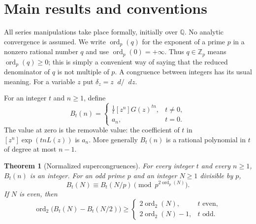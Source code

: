 \documentclass[11pt,letterpaper]{article}
\numberwithin{equation}{section}
\newtheorem{theorem}{Theorem}[section]
\theoremstyle{definition}
\theoremstyle{remark}
\newcommand{\Q}{\mathbb Q}
\newcommand{\Zp}{\mathbb Z_p}
\newcommand{\vp}{\operatorname{ord}_p}
\newcommand{\vtwo}{\operatorname{ord}_2}
\newcommand{\dd}{\mathop{}\!d}
\begin{document}
\section{Main results and conventions}\label{sec:main}
All series manipulations take place formally, initially over $\Q$.
No analytic convergence is assumed. We write $\vp(q)$ for the exponent
of a prime $p$ in a nonzero rational number $q$ and use
$\vp(0)=+\infty$. Thus $q\in\Zp$ means $\vp(q)\ge0$; this is simply a
convenient way of saying that the reduced denominator of $q$ is not
multiple of $p$. A congruence between integers has its usual meaning.
For a variable $z$ put $\delta_z=z\dd/\dd z$.

For an integer $t$ and $n\ge1$, define
\begin{equation}\label{eq:Bt}
 B_t(n)=
 \begin{cases}
 \displaystyle\frac1t[z^n]G(z)^{tn},&t\ne0,\\[5pt]
 a_n,&t=0.
 \end{cases}
\end{equation}
The value at zero is the removable value: the coefficient of $t$ in
$[z^n]\exp(tnL(z))$ is $a_n$. More generally $B_t(n)$ is a rational
polynomial in $t$ of degree at most $n-1$.

\begin{theorem}[Normalized supercongruences]\label{thm:normalized}
For every integer $t$ and every $n\ge1$, $B_t(n)$ is an integer.
For an odd prime $p$ and an integer $N\ge1$ divisible by $p$,
\begin{equation}\label{eq:B-odd}
 B_t(N)\equiv B_t(N/p)\pmod{p^{2\vp(N)}}.
\end{equation}
If $N$ is even, then
\begin{equation}\label{eq:B-two}
 \vtwo\bigl(B_t(N)-B_t(N/2)\bigr)\ge
 \begin{cases}
 2\vtwo(N),&t\text{ even},\\
 2\vtwo(N)-1,&t\text{ odd}.
 \end{cases}
\end{equation}
\end{theorem}
\end{document}
